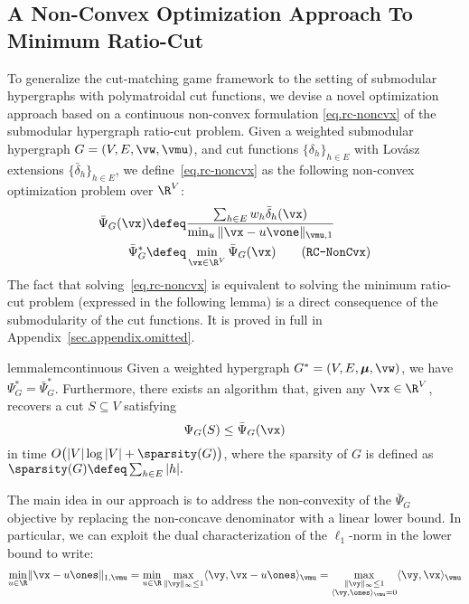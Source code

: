 \documentclass[letterpaper]{article}
\begin{document}
\subsection{A Non-Convex Optimization Approach To Minimum Ratio-Cut}
\label{sec.results.ci}

To generalize the cut-matching game framework to the setting of submodular hypergraphs with polymatroidal cut functions, we devise a novel optimization approach based on a continuous non-convex formulation \eqref{eq.rc-noncvx} of the submodular hypergraph ratio-cut problem.
Given a weighted submodular hypergraph $G = (V, E, \vw, \vmu)$, and cut functions $\{ \delta_h \}_{h \in E}$ with Lov\'asz extensions $\{\bar{\delta}_h\}_{h \in E}$, we define~\eqref{eq.rc-noncvx} as the following non-convex optimization problem over $\R^V$:
\begin{align*}
\bar{\Psi}_G(\vx)
&\defeq \frac{\sum_{h \in E} w_h \bar{\delta}_h(\vx)}{\min_u \|\vx - u \vone\|_{\vmu,1}} \\
\bar{\Psi}_G^*
&\defeq \min_{\vx \in \R^V} \bar{\Psi}_G(\vx)
\stepcounter{equation}
\tag{\texttt{RC-NonCvx}}
\label{eq.rc-noncvx}
\end{align*}
The fact that solving~\eqref{eq.rc-noncvx} is equivalent to solving the minimum ratio-cut problem (expressed in the following lemma) is a direct consequence of the submodularity of the cut functions. It is proved in full in Appendix~\ref{sec.appendix.omitted}.

\begin{restatable}{lemma}{lemcontinuous}
\label{lem.continuous-to-discrete-equivalence}
Given a weighted hypergraph $G^*=(V,E,\boldsymbol\mu,\vw)$, we have $\Psi_G^* = \bar{\Psi}_G^*$. Furthermore, there exists an algorithm that, given any $\vx \in \R^V$, recovers a cut $S \subseteq V$ satisfying
\begin{equation*}
\Psi_G(S) \leq \bar{\Psi}_G(\vx)
\end{equation*}
in time $O\big( |V| \log |V| + \sparsity(G) \big)$, where the sparsity of $G$ is defined as $ \sparsity (G) \defeq \sum_{h\in E} |h|.$
\end{restatable}

The main idea in our approach is to address the non-convexity of the $\bar{\Psi}_G$ objective by replacing the non-concave denominator with a linear lower bound. In particular, we can exploit the dual characterization of the $\ell_1$-norm in the lower bound to write:
\begin{equation}\label{eq.calc}
\min_{u \in \R} \lVert \vx - u \ones \rVert_{1, \vmu}
= \min_{u \in \R} \max_{\lVert \vy \rVert_\infty \leq 1} \langle \vy, \vx - u \ones \rangle_{\vmu}
= \max_{\substack{\lVert \vy\rVert_\infty \leq 1 \\ \langle \vy, \ones \rangle_{\vmu} = 0}} \langle \vy, \vx \rangle_{\vmu}
\end{equation}
\end{document}
